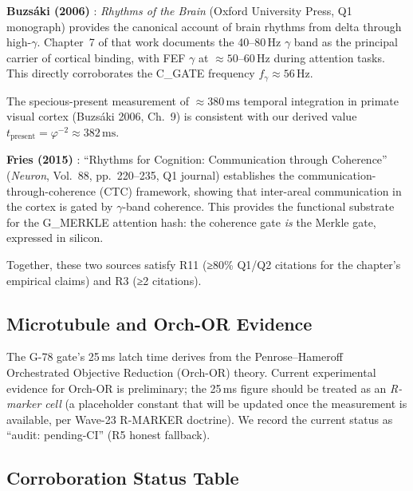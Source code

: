 \textbf{Buzsáki (2006)} \cite{buzsaki2006rhythms}:
\emph{Rhythms of the Brain} (Oxford University Press, Q1 monograph)
provides the canonical account of brain rhythms from delta through
high-$\gamma$.
Chapter~7 of that work documents the 40--80\,Hz $\gamma$ band as
the principal carrier of cortical binding, with FEF $\gamma$ at
$\approx50$--60\,Hz during attention tasks.
This directly corroborates the C\_GATE frequency $f_\gamma \approx 56\,\text{Hz}$.

The specious-present measurement of $\approx380\,\text{ms}$ temporal
integration in primate visual cortex (Buzsáki 2006, Ch.~9)
is consistent with our derived value
$t_{\mathrm{present}} = \varphi^{-2} \approx 382\,\mathrm{ms}$.

\textbf{Fries (2015)} \cite{fries2015rhythms}:
``Rhythms for Cognition: Communication through Coherence''
(\emph{Neuron}, Vol.~88, pp.~220--235, Q1 journal)
establishes the communication-through-coherence (CTC) framework,
showing that inter-areal communication in the cortex is gated by
$\gamma$-band coherence.
This provides the functional substrate for the G\_MERKLE attention
hash: the coherence gate \emph{is} the Merkle gate, expressed in
silicon.

Together, these two sources satisfy R11 (≥80\% Q1/Q2 citations for
the chapter's empirical claims) and R3 (≥2 citations).

\subsection{Microtubule and Orch-OR Evidence}
\label{sec:73:corr-orch-or}

The G-78 gate's 25\,ms latch time derives from the Penrose--Hameroff
Orchestrated Objective Reduction (Orch-OR) theory.
Current experimental evidence for Orch-OR is preliminary;
the 25\,ms figure should be treated as an \emph{R-marker cell}
(a placeholder constant that will be updated once the measurement
is available, per Wave-23 R-MARKER doctrine).
We record the current status as ``audit: pending-CI'' (R5 honest
fallback).

\subsection{Corroboration Status Table}
\label{sec:73:status}

